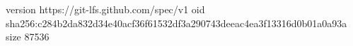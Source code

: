 version https://git-lfs.github.com/spec/v1
oid sha256:c284b2da832d34e40acf36f61532df3a290743deeac4ea3f13316d0b01a0a93a
size 87536
